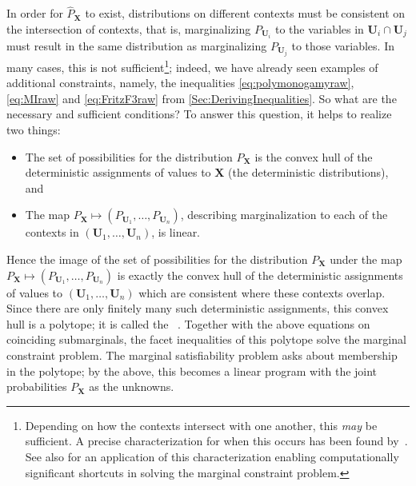 \documentclass[aps,english,10pt,superscriptaddress,onecolumn,twoside,longbibliography,pra,floatfix,fleqn,nofootinbib]{revtex4-1}%
\newcommand*{\tblue}[1]{{\color{MidnightBlue}{\textbf{#1}}}}
\theoremstyle{definition}
\newcounter{example}[section]
\begin{document}
In order for $\hat{P}_{\bm{X}}$ to exist,  distributions on different contexts must be consistent on the intersection of contexts, that is, marginalizing $P_{\bm{U}_i}$ to the variables in $\bm{U}_i\cap\bm{U}_j$ must result in the same distribution as marginalizing $P_{\bm{U}_j}$ to those variables.  
  In many cases, this is not sufficient\footnote{Depending on how the contexts intersect with one another, this \emph{may} be sufficient. A precise characterization for when this occurs has been found by~\citet{vorobev_extension_1960}. See also \citet[Thm. 2]{chaves2016limitedmarginals} for an application of this characterization enabling computationally significant shortcuts in solving the marginal constraint problem.}; indeed, we have already seen examples of additional constraints, namely, the inequalities \eqref{eq:polymonogamyraw}, \eqref{eq:MIraw} and \eqref{eq:FritzF3raw} from \cref{Sec:DerivingInequalities}.
So what are the necessary and sufficient conditions? To answer this question, it helps to realize two things:
\begin{itemize}
	\item The set of possibilities for the distribution $P_{\bm{X}}$ is the convex hull of the deterministic assignments of values to $\bm{X}$ (the deterministic distributions), and 
	\item The map $P_{\bm{X}}\mapsto (P_{\bm{U}_1},\ldots,P_{\bm{U}_n})$, describing marginalization to each of the contexts in $(\bm{U}_1,\ldots,\bm{U}_n)$, is linear.
\end{itemize}
Hence the image of the set of possibilities for the distribution $P_{\bm{X}}$ under the map $P_{\bm{X}}\mapsto (P_{\bm{U}_1},\ldots,P_{\bm{U}_n})$ is exactly the convex hull of the deterministic assignments of values to $(\bm{U}_1,\ldots,\bm{U}_n)$ which are consistent where these contexts overlap. Since there are only finitely many such deterministic assignments, this convex hull is a polytope; it is called the \tblue{marginal polytope}~\cite{kahle_marginal_2010}. Together with the above equations on coinciding submarginals, the facet inequalities of this polytope solve the marginal constraint problem. The marginal satisfiability problem asks about membership in the polytope; by the above, this becomes a linear program with the joint probabilities $P_{\bm{X}}$ as the unknowns.
\end{document}
